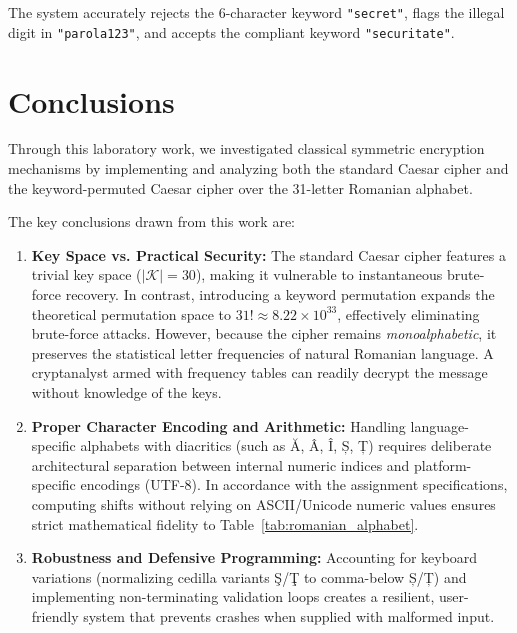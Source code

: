 \documentclass[12pt,a4paper]{article}
\begin{document}
The system accurately rejects the 6-character keyword \texttt{"secret"}, flags the illegal digit in \texttt{"parola123"}, and accepts the compliant keyword \texttt{"securitate"}.

\section{Conclusions}

Through this laboratory work, we investigated classical symmetric encryption mechanisms by implementing and analyzing both the standard Caesar cipher and the keyword-permuted Caesar cipher over the 31-letter Romanian alphabet.

The key conclusions drawn from this work are:
\begin{enumerate}
    \item \textbf{Key Space vs. Practical Security:}
    The standard Caesar cipher features a trivial key space ($|\mathcal{K}| = 30$), making it vulnerable to instantaneous brute-force recovery. In contrast, introducing a keyword permutation expands the theoretical permutation space to $31! \approx 8.22 \times 10^{33}$, effectively eliminating brute-force attacks. However, because the cipher remains \textit{monoalphabetic}, it preserves the statistical letter frequencies of natural Romanian language. A cryptanalyst armed with frequency tables can readily decrypt the message without knowledge of the keys.
    \item \textbf{Proper Character Encoding and Arithmetic:}
    Handling language-specific alphabets with diacritics (such as Ă, Â, Î, Ș, Ț) requires deliberate architectural separation between internal numeric indices and platform-specific encodings (UTF-8). In accordance with the assignment specifications, computing shifts without relying on ASCII/Unicode numeric values ensures strict mathematical fidelity to Table~\ref{tab:romanian_alphabet}.
    \item \textbf{Robustness and Defensive Programming:}
    Accounting for keyboard variations (normalizing cedilla variants Ş/Ţ to comma-below Ș/Ț) and implementing non-terminating validation loops creates a resilient, user-friendly system that prevents crashes when supplied with malformed input.
\end{enumerate}

\end{document}
